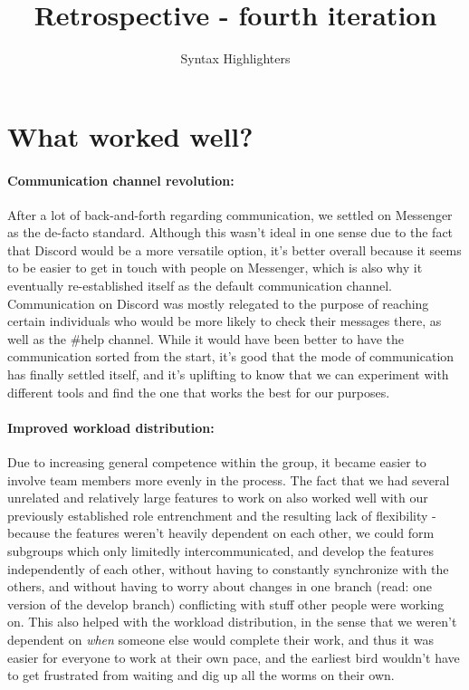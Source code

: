\documentclass{article}
\title{Retrospective - fourth iteration}
\author{Syntax Highlighters}
\begin{document}
\maketitle

\section*{What worked well?}

\paragraph{Communication channel revolution:} After a lot of back-and-forth regarding communication, we settled on Messenger as the de-facto standard. Although this wasn't ideal in one sense due to the fact that Discord would be a more versatile option, it's better overall because it seems to be easier to get in touch with people on Messenger, which is also why it eventually re-established itself as the default communication channel. Communication on Discord was mostly relegated to the purpose of reaching certain individuals who would be more likely to check their messages there, as well as the \#help channel. While it would have been better to have the communication sorted from the start, it's good that the mode of communication has finally settled itself, and it's uplifting to know that we can experiment with different tools and find the one that works the best for our purposes.

\paragraph{Improved workload distribution:} Due to increasing general competence within the group, it became easier to involve team members more evenly in the process. The fact that we had several unrelated and relatively large features to work on also worked well with our previously established role entrenchment and the resulting lack of flexibility - because the features weren't heavily dependent on each other, we could form subgroups which only limitedly intercommunicated, and develop the features independently of each other, without having to constantly synchronize with the others, and without having to worry about changes in one branch (read: one version of the develop branch) conflicting with stuff other people were working on. This also helped with the workload distribution, in the sense that we weren't dependent on \textit{when} someone else would complete their work, and thus it was easier for everyone to work at their own pace, and the earliest bird wouldn't have to get frustrated from waiting and dig up all the worms on their own.
\end{document}

